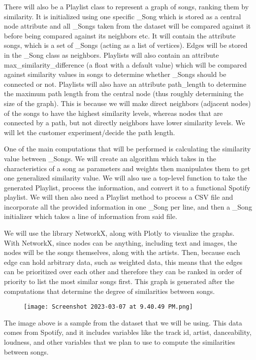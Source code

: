 \documentclass[fontsize=11pt]{article}
\begin{document}
\noindent There will also be a Playlist class to represent a graph of songs, ranking them by similarity. It is initialized using one specific \_Song which is stored as a central node attribute and all \_Songs taken from the dataset will be compared against it before being compared against its neighbors etc. It will contain the attribute songs, which is a set of \_Songs (acting as a list of vertices). Edges will be stored in the \_Song class as neighbors. Playlists will also contain an attribute max\_similarity\_difference (a float with a default value) which will be compared against similarity values in songs to determine whether \_Songs should be connected or not. Playlists will also have an attribute path\_length to determine the maximum path length from the central node (thus roughly determining the size of the graph). This is because we will make direct neighbors (adjacent nodes) of the songs to have the highest similarity levels, whereas nodes that are connected by a path, but not directly neighbors have lower similarity levels. We will let the customer experiment/decide the path length. \newline 

\noindent One of the main computations that will be performed is calculating the similarity value between \_Songs. We will create an algorithm which takes in the characteristics of a song as parameters and weights then manipulates them to get one generalized similarity value. 
We will also use a top-level function to take the generated Playlist, process the information, and convert it to a functional Spotify playlist.
We will then also need a Playlist method to process a CSV file and incorporate all the provided information in one \_Song per line, and then a \_Song initializer which takes a line of information from said file.\newline

\noindent We will use the library NetworkX, along with Plotly to visualize the graphs. With NetworkX, since nodes can be anything, including text and images, the nodes will be the songs themselves, along with the artists. Then, because each edge can hold arbitrary data, such as weighted data, this means that the edges can be prioritized over each other and therefore they can be ranked in order of priority to list the most similar songs first.  This graph is generated after the computations that determine the degree of  similarities between songs. 

\begin{figure}[htp]
    \centering
    \texttt{[image: Screenshot 2023-03-07 at 9.40.49 PM.png]}
    \label{fig:galaxy}
\end{figure}
\noindent The image above is a sample from the dataset that we will be using. This data comes from Spotify, and it includes variables like the track id, artist, danceability, loudness, and other variables that we plan to use to compute the similarities between songs. 
\end{document}
